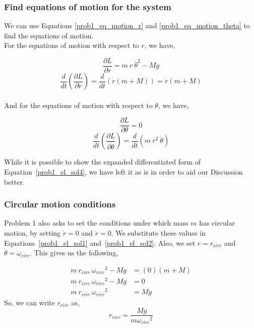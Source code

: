 \documentclass[conference]{IEEEtran}
\begin{document}
\subsubsection{Find equations of motion for the system}
We can use Equations \ref{prob1_eq_motion_r} and \ref{prob1_eq_motion_theta}
to find the equations of motion.\\

For the equations of motion with respect to $r$, we have,

\begin{equation}\label{prob1_el_sol1}
    \frac{\partial L}{\partial r} = m~r~\dot{\theta}^2 - Mg
\end{equation}
\begin{equation}\label{prob1_el_sol2}
    \frac{d}{dt}\left(\frac{\partial L}{\partial \dot{r}}\right) 
    = \frac{d}{dt}\left( \dot{r}(m + M) \right) = \ddot{r}(m + M)
\end{equation}\\

And for the equations of motion with respect to $\theta$, we have,

\begin{equation}\label{prob1_el_sol3}
    \frac{\partial L}{\partial \theta} = 0
\end{equation}
\begin{equation}\label{prob1_el_sol4}
    \frac{d}{dt}\left(\frac{\partial L}{\partial \dot{\theta}}\right) 
    = \frac{d}{dt}\left( m~r^2~\dot{\theta} \right)
\end{equation}

While it is possible to show the expanded differentiated form of 
Equation~\ref{prob1_el_sol4}, we have left it as is in order
to aid our Discussion better.

\subsubsection{Circular motion conditions}

Problem 1 also asks to set the conditions under which mass $m$
has circular motion, by setting
$\dot{r} = 0$ and $\ddot{r} = 0$. We substitute these values in Equations~\ref{prob1_el_sol1}
and~\ref{prob1_el_sol2}. Also, we set $r = r_{circ}$ and $\dot{\theta} = \omega_{circ}$.
This gives us the following,

\begin{align*}
    m~r_{circ}~{\omega_{circ}}^2 - Mg &= (0) (m + M)\\
    m~r_{circ}~{\omega_{circ}}^2 - Mg &= 0\\
    m~r_{circ}~{\omega_{circ}}^2 &= Mg
\end{align*}
So, we can write $r_{circ}$ as,
\begin{equation}\label{r_circ_val}
    r_{circ} = \frac{Mg}{m{\omega_{circ}}^2}
\end{equation}
\end{document}
